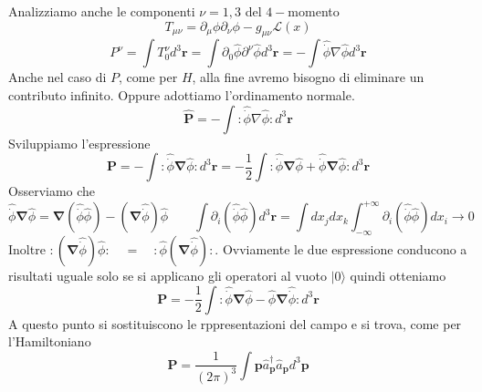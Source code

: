 Analizziamo anche le componenti $\nu=1,3$ del $4-$momento
$$
T_{\mu\nu} = \partial_\mu\phi\partial_\nu\phi - g_{\mu\nu}\mathcal{L}(x)
$$
$$
P^\nu = \int T_0^\nu d^3\mathbf{r} = \int \partial_0\hat{\phi}\partial^\nu\hat{\phi} d^3\mathbf{r} = -\int \hat{\dot{\phi}}\nabla\hat{\phi} d^3\mathbf{r}
$$
Anche nel caso di $P$, come per $H$, alla fine avremo bisogno di eliminare un contributo infinito. Oppure adottiamo l'ordinamento normale.
$$
\hat{\mathbf{P}} = -\int : \hat{\dot{\phi}}\nabla\hat{\phi} : d^3\mathbf{r}
$$
Sviluppiamo l'espressione
$$
\mathbf{P} = -\int : \hat{\dot{\phi}}\boldsymbol{\nabla}\hat{\phi} : d^3\mathbf{r} = -\frac{1}{2} \int : \hat{\dot{\phi}}\boldsymbol{\nabla}\hat{\phi} + \hat{\dot{\phi}}\boldsymbol{\nabla}\hat{\phi} : d^3\mathbf{r}
$$
Osserviamo che 
$$
\hat{\dot{\phi}}\boldsymbol{\nabla}\hat{\phi} = \boldsymbol{\nabla}(\hat{\dot{\phi}}\hat{\phi}) - (\boldsymbol{\nabla}\hat{\dot{\phi}})\hat{\phi} \qquad \int \partial_i(\hat{\dot{\phi}}\hat{\phi}) d^3\mathbf{r} = \int dx_j dx_k \int_{-\infty}^{+\infty} \partial_i(\hat{\dot{\phi}}\hat{\phi}) dx_i \to 0
$$
Inoltre $:(\boldsymbol{\nabla}\hat{\dot{\phi}})\hat{\phi}: \quad = \quad :\hat{\phi}(\boldsymbol{\nabla}\hat{\dot{\phi}}):$. Ovviamente le due espressione conducono a risultati uguale solo se si applicano gli operatori al vuoto $|0\rangle$ quindi otteniamo
$$
\mathbf{P} = -\frac{1}{2} \int : \hat{\dot{\phi}}\boldsymbol{\nabla}\hat{\phi} - \hat{\phi}\boldsymbol{\nabla}\hat{\dot{\phi}} : d^3\mathbf{r}
$$
A questo punto si sostituiscono le rppresentazioni del campo e si trova, come per l'Hamiltoniano
$$
\mathbf{P} = \frac{1}{(2\pi)^3} \int \mathbf{p} \hat{a}_\mathbf{p}^\dagger \hat{a}_\mathbf{p} d^3\mathbf{p}
$$
